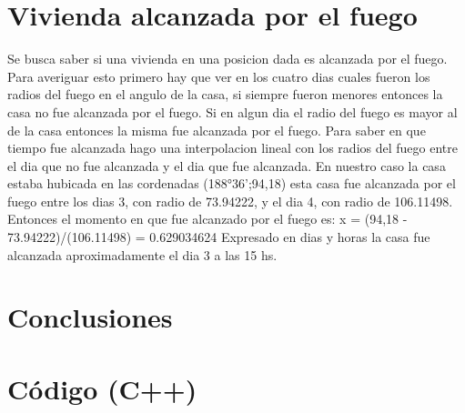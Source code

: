 \documentclass[12pt,spanish]{article}
\begin{document}
\section*{Vivienda alcanzada por el fuego}
Se busca saber si una vivienda en una posicion dada es alcanzada por el fuego.
Para averiguar esto primero hay que ver en los cuatro dias cuales fueron los radios del fuego en el angulo de la casa, si siempre fueron menores entonces la casa no fue alcanzada por el fuego.
Si en algun dia el radio del fuego es mayor al de la casa entonces la misma fue alcanzada por el fuego. Para saber en que tiempo fue alcanzada hago una interpolacion lineal con los radios del fuego entre el dia que no fue alcanzada y el dia que fue alcanzada.
En nuestro caso la casa estaba hubicada en las cordenadas (188°36';94,18) esta casa fue alcanzada por el fuego entre los dias 3, con radio de 73.94222, y el dia 4, con radio de 106.11498.
Entonces el momento en que fue alcanzado por el fuego es: x = (94,18 - 73.94222)/(106.11498) = 0.629034624
Expresado en dias y horas la casa fue alcanzada aproximadamente el dia 3 a las 15 hs.
\section*{Conclusiones}

\newpage
\section{Código (C++)}

\end{document}
